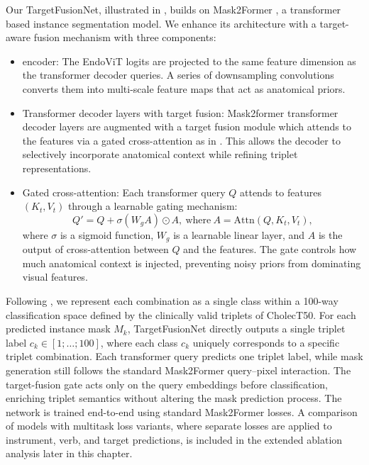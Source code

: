 \label{sec:targetfusionnet}
Our TargetFusionNet, illustrated in , builds on Mask2Former \cite{cheng2022masked}, a transformer based instance segmentation model. 
We enhance its architecture with a target-aware fusion mechanism with three components:
%
\begin{itemize}
    \item \Anatprior encoder: The EndoViT logits are projected to the same feature dimension as the transformer decoder queries. A series of downsampling convolutions converts them into multi-scale \anatprior feature maps that act as anatomical priors.
    
    \item Transformer decoder layers with target fusion: Mask2former transformer decoder layers are augmented with a target fusion module which attends to the \anatprior features via a gated cross-attention as in . This allows the decoder to selectively incorporate anatomical context while refining triplet representations.
    
    \item Gated cross-attention: Each transformer query \( Q \) attends to \anatprior features \( (K_t, V_t) \) through a learnable gating mechanism:
    \[
    Q' = Q + \sigma(W_g A) \odot A,
    ~ \mathrm{where} ~  A = \mathrm{Attn}(Q, K_t, V_t),
    \]
    where \( \sigma \) is a sigmoid function, \( W_g \) is a learnable linear layer, and \( A \) is the output of cross-attention between \( Q \) and the \anatprior features. The gate controls how much anatomical context is injected, preventing noisy priors from dominating visual features.

\end{itemize}
%



Following \citet{NWOYE2022102433_rendevous}, we represent each \ivttriplet combination as a single class within a 100-way classification space defined by the clinically valid triplets of CholecT50.
For each predicted instance mask $M_k$, TargetFusionNet directly outputs a single triplet label $c_k \in {[1; \dots; 100]}$, where each class $c_k$ uniquely corresponds to a specific triplet combination. 
Each transformer query predicts one triplet label, while mask generation still follows the standard Mask2Former query–pixel interaction. The target-fusion gate acts only on the query embeddings before classification, enriching triplet semantics without altering the mask prediction process.
The network is trained end-to-end using standard Mask2Former losses. A comparison of models with multitask loss variants, where separate losses are applied to instrument, verb, and target predictions, is included in the extended ablation analysis later in this chapter.




